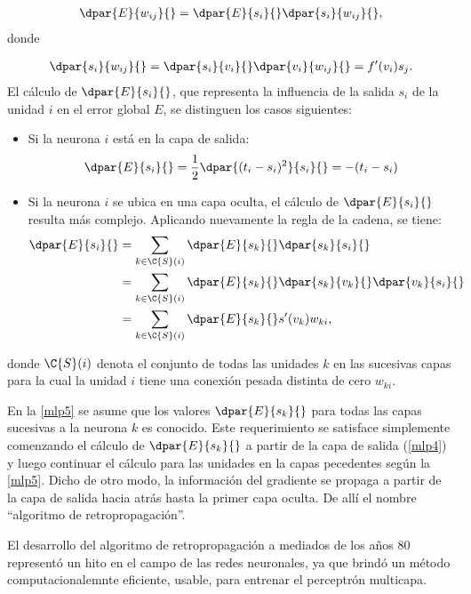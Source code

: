 \begin{align}
  \dpar{E}{w_{ij}}{} = \dpar{E}{s_{i}}{}\dpar{s_i}{w_{ij}}{},
\end{align}
donde

\begin{align}
  \dpar{s_i}{w_{ij}}{} = \dpar{s_i}{v_{i}}{}\dpar{v_i}{w_{ij}}{} =
  f'(v_i) s_j .
\end{align}
El cálculo de $\dpar{E}{s_i}{}$, que representa la influencia
de la salida $s_i$ de la unidad $i$ en el error global $E$,
se distinguen los casos siguientes:

\begin{itemize}
\item Si la neurona $i$ está en la capa de salida:
  \begin{align}\label{mlp4}
    \dpar{E}{s_i}{}=\frac{1}{2}\dpar{(t_i-s_i)^2}{s_i}{}=-(t_i-s_i)
  \end{align}
\item Si la neurona $i$ se ubica en una capa oculta, el cálculo de
  $\dpar{E}{s_i}{}$ resulta más complejo. Aplicando nuevamente la
  regla de la cadena, se tiene:
  \begin{align}\label{mlp5}
    \dpar{E}{s_i}{} &= \sum_{k\in\C{S}(i)}
      \dpar{E}{s_k}{}\dpar{s_k}{s_i}{} \notag\\
    &= \sum_{k\in\C{S}(i)}
      \dpar{E}{s_k}{}\dpar{s_k}{v_k}{}\dpar{v_k}{s_i}{} \notag\\
    &= \sum_{k\in\C{S}(i)} \dpar{E}{s_k}{} s'(v_k) w_{ki},
  \end{align}
\end{itemize}
donde $\C{S}(i)$ denota el conjunto de todas las unidades $k$ en las
sucesivas capas para la cual la unidad $i$ tiene una conexión
pesada distinta de cero $w_{ki}$.

En la \autoref{mlp5} se asume que los valores $\dpar{E}{s_k}{}$ para todas
las capas sucesivas a la neurona $k$ es conocido. Este requerimiento
se satisface simplemente comenzando el cálculo de $\dpar{E}{s_k}{}$ a
partir de la capa de salida (\autoref{mlp4}) y luego continuar el cálculo
para las unidades en la capas pecedentes según la \autoref{mlp5}.  Dicho de
otro modo, la información del gradiente se propaga a partir de la capa
de salida hacia atrás hasta la primer capa oculta. De allí el nombre
``algoritmo de retropropagación''.

El desarrollo del algoritmo de retropropagación a mediados de los años
80 representó un hito en el campo de las redes neuronales, ya
que brindó un método computacionalemnte eficiente, usable, para
entrenar el perceptrón multicapa.

